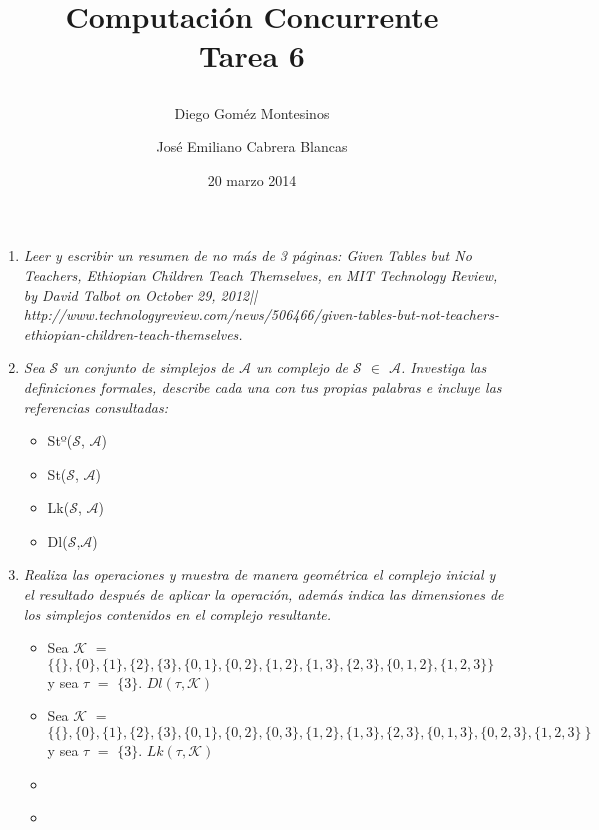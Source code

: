 \documentclass{article}
\title{ Computación Concurrente \\ \Large{Tarea 6}
\author{
  Diego Goméz Montesinos
  \and
  José Emiliano Cabrera Blancas
  }
\date{20 marzo 2014}
}
\begin{document}
\maketitle
\begin{enumerate}
  
\item{
    \textsl{
      Leer y escribir un resumen de no más de 3 páginas: Given Tables
      but No Teachers, Ethiopian Children Teach Themselves, en MIT
      Technology Review, by David Talbot on October 29, 2012||
      http://www.technologyreview.com/news/506466/given-tables-but-not-teachers-ethiopian-children-teach-themselves.\\
    }
    
  }
  
  \item{
      \textsl{
    Sea $\mathcal{S}$ un conjunto de simplejos de $\mathcal{A}$ un
    complejo de $\mathcal{S}$ $\in$ $\mathcal{A}$. Investiga las
    definiciones formales, describe cada una con tus propias palabras
    e incluye las referencias consultadas:
    }
    \begin{itemize}
    \item{Stº($\mathcal{S}$, $\mathcal{A}$)}
      
    \item{St($\mathcal{S}$, $\mathcal{A}$)}

    \item{Lk($\mathcal{S}$, $\mathcal{A}$)}

    \item{Dl($\mathcal{S}$,$\mathcal{A}$)}
    \end{itemize}

  
  }

\item{
    \textsl{
      Realiza las operaciones y muestra de manera geométrica el
      complejo inicial y el resultado después de aplicar la operación,
      además indica las dimensiones de los simplejos contenidos en el
      complejo resultante.
    }

    \begin{itemize}
    \item{
        Sea $\mathcal{K}$ $=$ $\{\{\}, \{0\}, \{1\}, \{2\}, \{3\},
        \{0,1\}, \{0,2\}, \{1,2\}, \{1,3\}, \{2,3\}, \{0,1,2\},
        \{1,2,3\} \}$ y sea $\tau$ $=$ $\{3\}$. $Dl(\tau,\mathcal{K})$
      }
      
    \item{

        Sea $\mathcal{K}$ $=$ $\{\{\}, \{0\}, \{1\}, \{2\}, \{3\},
        \{0,1\}, \{0,2\}, \{0,3\}, \{1,2\}, \{1,3\}, \{2,3\}, \{0,1,3\},
        \{0,2,3\}, \{1,2,3\}\ \}$ y sea $\tau$ $=$ $\{3\}$. $Lk(\tau,\mathcal{K})$
        
      }

    \item{
      }

    \item{
      }
    \end{itemize}

    
  }

\end{enumerate}
\end{document}
